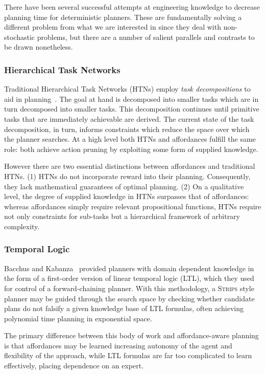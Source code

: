 \documentclass[letterpaper]{article}
\begin{document}
There have been several successful attempts at engineering knowledge
to decrease planning time for deterministic planners. These are
fundamentally solving a different problem from what we are interested
in since they deal with non-stochastic problems, but there are a
number of salient parallels and contrasts to be drawn nonetheless.

\subsubsection{Hierarchical Task Networks}
Traditional Hierarchical Task Networks (HTNs) employ \textit{task decompositions} to aid in planning~\cite{erol1994htn}. The goal at hand is decomposed into smaller tasks which are in turn decomposed into smaller tasks. This decomposition continues until primitive tasks that are immediately achievable are derived. The current state of the task decomposition, in turn, informs constraints which reduce the space over which the planner searches. At a high level both HTNs and affordances fulfill the same role: both achieve action pruning by exploiting some form of supplied knowledge. 

However there are two essential distinctions between affordances and traditional HTNs.  (1) HTNs do not incorporate reward into their planning. Consequently, they lack mathematical guarantees of optimal planning. (2) On a qualitative level, the degree of supplied knowledge in HTNs surpasses that of affordances: whereas affordances simply require relevant propositional functions, HTNs require not only constraints for sub-tasks but a hierarchical framework of arbitrary complexity.

\subsubsection{Temporal Logic}
Bacchus and Kabanza~\cite{Bacchus95usingtemporal,Bacchus99usingtemporal} provided
planners with domain dependent knowledge in the form of a first-order version of linear
temporal logic (LTL), which they used for control of a forward-chaining planner. With this methodology, 
a \textsc{Strips} style planner may be guided through the search space by checking 
whether candidate plans do not falsify a given knowledge base of LTL formulas, often
achieving polynomial time planning in exponential space.

The primary difference between this body of work and affordance-aware planning is that
affordances may be learned increasing autonomy of the agent and flexibility of the approach, while LTL formulas are far
too complicated to learn effectively, placing dependence on an expert.
\end{document}

